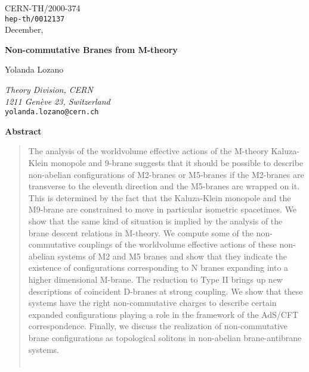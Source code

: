 \documentclass[12pt,a4paper]{article}
\begin{document}
\baselineskip16pt

\begin{flushright}
\footnotesize
\footnotesize
CERN-TH/2000-374\\
{\tt hep-th/0012137}\\
December, \coordHE{}
\normalsize
\end{flushright}

\vspace{8mm}

\begin{center}



\vspace{.8cm}
{\Large \bf Non-commutative Branes from M-theory} 

\vspace{1cm}



Yolanda Lozano

\vspace{.5cm}

{
{\small \sl Theory Division, CERN\\
1211 Gen\`eve 23, Switzerland}\\
{\tt yolanda.lozano@cern.ch}
}

\vspace{.4cm}



\vspace{2cm}


{\bf Abstract}

\end{center}
\begin{quotation}

\small

The analysis of the worldvolume effective actions of the M-theory
Kaluza-Klein monopole and 9-brane suggests that
it should be possible to describe non-abelian configurations of M2-branes
or M5-branes if the M2-branes are transverse to the
eleventh direction and the M5-branes are wrapped 
on it. This is determined by the fact that the Kaluza-Klein
monopole and the M9-brane are constrained to move in particular isometric
spacetimes. We show that the
same kind of situation is implied by the analysis of the brane
descent relations in M-theory.
We compute some of the non-commutative couplings of the
worldvolume effective actions of these non-abelian systems 
of M2 and M5 branes and show that they
indicate the existence of configurations corresponding to N branes expanding
into a higher dimensional M-brane. The reduction to Type II brings up
new descriptions of coincident D-branes at strong coupling.
We show that these systems have the right non-commutative charges
to describe certain expanded configurations playing a role in the
framework of the AdS/CFT correspondence. Finally, we discuss the
realization of non-commutative brane configurations as topological
solitons in non-abelian brane-antibrane systems.\\
\\


\end{quotation}
\end{document}
